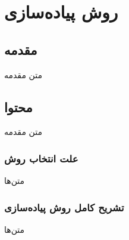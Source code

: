 \section{روش پیاده‌سازی}\label{sec:implementation}

\subsection{مقدمه}\label{subsec:impl_intro}
متن مقدمه

\subsection{محتوا}\label{subsec:impl_mohtava}
متن مقدمه

\subsubsection{علت انتخاب روش}
متن‌ها

\subsubsection{تشریح کامل روش پیاده‌سازی}
متن‌ها


\cleardoublepage 